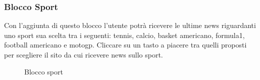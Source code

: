 \subsubsection{Blocco Sport}
Con l'aggiunta di questo blocco l'utente potrà ricevere le ultime news riguardanti uno sport sua scelta tra i seguenti: tennis, calcio, basket americano, formula1, football americano e motogp.
Cliccare su un tasto a piacere tra quelli proposti per scegliere il sito da cui ricevere news sullo sport.
	\begin{figure}[!ht]
		\centering
		\caption{Blocco sport}
	\end{figure}
\newpage
